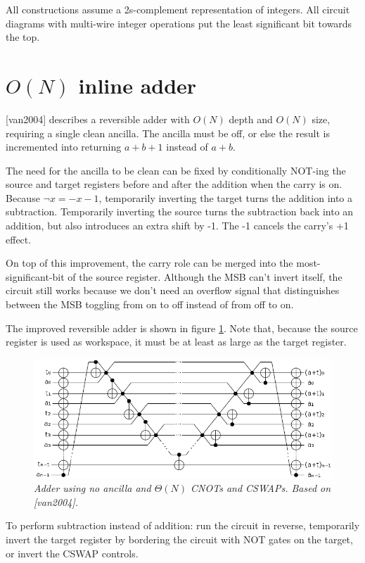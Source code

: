\documentclass[twocolumn]{article}
\begin{document}
All constructions assume a 2s-complement representation of integers.
All circuit diagrams with multi-wire integer operations put the least significant bit towards the top.

\section{$O(N)$ inline adder}

[van2004] describes a reversible adder with $O(N)$ depth and $O(N)$ size, requiring a single clean ancilla.
The ancilla must be off, or else the result is incremented into returning $a+b+1$ instead of $a+b$.

The need for the ancilla to be clean can be fixed by conditionally NOT-ing the source and target registers before and after the addition when the carry is on.
Because $\lnot x = -x-1$, temporarily inverting the target turns the addition into a subtraction.
Temporarily inverting the source turns the subtraction back into an addition, but also introduces an extra shift by -1.
The -1 cancels the carry's +1 effect.

On top of this improvement, the carry role can be merged into the most-significant-bit of the source register.
Although the MSB can't invert itself, the circuit still works because we don't need an overflow signal that distinguishes between the MSB toggling from on to off instead of from off to on.

The improved reversible adder is shown in figure \ref{fig:inlineadder}.
Note that, because the source register is used as workspace, it must be at least as large as the target register.

\begin{figure}
  \centering
  \includegraphics[totalheight=3cm]{inline-adder.png}
  \caption{\em Adder using no ancilla and $\Theta(N)$ CNOTs and CSWAPs. Based on [van2004].}
  \label{fig:inlineadder}
\end{figure}

To perform subtraction instead of addition: run the circuit in reverse, temporarily invert the target register by bordering the circuit with NOT gates on the target, or invert the CSWAP controls.
\end{document}

